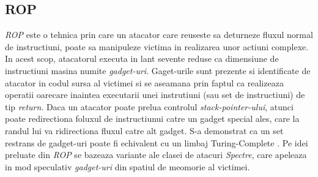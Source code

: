 \subsection{ROP}\label{sec:rop}

\emph{ROP} \cite{shacham2007geometry} este o tehnica prin care un atacator care
reuseste sa deturneze fluxul normal de instructiuni, poate sa manipuleze
victima in realizarea unor actiuni complexe. In acest scop, atacatorul executa
in lant sevente reduse ca dimensiune de instructiuni masina numite
\emph{gadget-uri}. Gaget-urile sunt prezente si identificate de atacator in
codul sursa al victimei si se aseamana prin faptul ca realizeaza operatii
oarecare inaintea executarii unei instrutiuni (sau set de instructiuni) de tip
\emph{return}. Daca un atacator poate prelua controlul
\emph{stack-pointer-ului}, atunci poate redirectiona foluxul de instructiunui
catre un gadget special ales, care la randul lui va ridirectiona fluxul catre
alt gadget. S-a demonstrat ca un set restrans de gadget-uri poate fi echivalent
cu un limbaj Turing-Complete \cite{homescu2012microgadgets}. Pe idei preluate
din \emph{ROP} se bazeaza variante ale clasei de atacuri \emph{Spectre}, care
apeleaza in mod speculativ \emph{gadget-uri} din spatiul de meomorie al
victimei.
